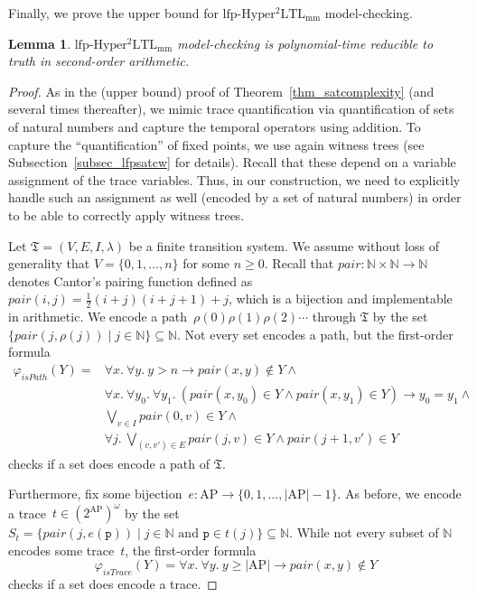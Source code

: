 \documentclass[dvipsnames,10pt,a4paper]{amsart}
\newtheorem{lem}[thm]{Lemma}
\theoremstyle{definition}
\theoremstyle{remark}
\newcommand{\nats}{\mathbb{N}}
\renewcommand{\phi}{\varphi}
\newcommand{\size}[1]{|#1|}
\newcommand{\pow}[1]{2^{#1}}
\newcommand{\set}[1]{\{#1\}}
\newcommand{\lfpsohyltlfp}{\mathrm{lfp\text{-}{Hyper^2LTL_{\mathrm{mm}}}}\xspace}
\newcommand{\ap}[0]{\mathrm{AP}}
\newcommand{\myquot}[1]{``#1''}
\newcommand{\tsys}{\mathfrak{T}}
\newcommand{\proposition}{\texttt{p}}
\newcommand{\pair}{\mathit{pair}}
\newcommand{\istrace}{\mathit{isTrace}}
\newcommand{\ispath}{\mathit{isPath}}
\begin{document}
Finally, we prove the upper bound for $\lfpsohyltlfp$ model-checking.

\begin{lem}
\label{lemma_mc_soaeasy}
$\lfpsohyltlfp$ model-checking is polynomial-time reducible to truth in second-order arithmetic. 
\end{lem}

\begin{proof}
As in the (upper bound) proof of Theorem~\ref{thm_satcomplexity} (and several times thereafter), we mimic trace quantification via quantification of sets of natural numbers and capture the temporal operators using addition. 
To capture the \myquot{quantification} of fixed points, we use again witness trees (see Subsection~\ref{subsec_lfpsatcw} for details). 
Recall that these depend on a variable assignment of the trace variables. 
Thus, in our construction, we need to explicitly handle such an assignment as well (encoded by a set of natural numbers) in order to be able to correctly apply witness trees.

Let $\tsys = (V,E,I,\lambda)$ be a finite transition system. 
We assume without loss of generality that $V = \set{0,1,\ldots, n}$ for some $n \ge 0$.
Recall that $\pair \colon \nats\times\nats \rightarrow\nats$ denotes Cantor's pairing function defined as $\pair(i,j) = \frac{1}{2}(i+j)(i+j+1) +j$, which is a bijection and implementable in arithmetic.
We encode a path~$\rho(0)\rho(1)\rho(2)\cdots$ through $\tsys$ by the set~$\set{\pair(j,\rho(j)) \mid j \in\nats} \subseteq \nats$.
Not every set encodes a path, but the first-order formula
\begin{align*}
\phi_\ispath(Y) = {}&{} \forall x.\ \forall y.\ y > n \rightarrow \pair(x,y) \notin Y \wedge \\
{}&{} \forall x.\ \forall y_0.\ \forall y_1.\ (\pair(x,y_0) \in Y \wedge
 \pair(x,y_1) \in Y) \rightarrow y_0=y_1  \wedge  \\
{}&{} \bigvee_{v \in I} \pair(0,v) \in Y \wedge \\
{}&{} \forall j.\ \bigvee_{(v,v') \in E} \pair(j,v) \in Y \wedge \pair(j+1,v') \in Y
\end{align*}
checks if a set does encode a path of $\tsys$.

Furthermore, fix some bijection~$e \colon \ap \rightarrow\set{0,1,\ldots,\size{\ap}-1}$.
As before, we encode a trace~$t \in (\pow{\ap})^\omega$ by the set~$S_t =\set{\pair(j,e(\proposition)) \mid j \in \nats \text{ and } \proposition \in t(j)} \subseteq \nats$.
While not every subset of $\nats$ encodes some trace~$t$, the first-order formula 
\[\phi_\istrace(Y) = \forall x.\ \forall y.\ y \ge \size{\ap} \rightarrow \pair(x,y) \notin Y \] checks if a set does encode a trace.


\end{proof}
\end{document}
